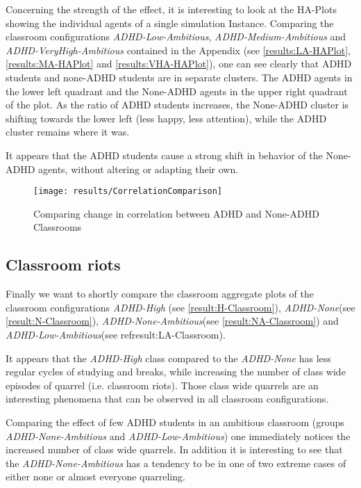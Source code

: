 Concerning the strength of the effect, it is interesting to look at the HA-Plots
showing the individual agents of a single simulation Instance. Comparing the classroom
configurations \textit{ADHD-Low-Ambitious}, \textit{ADHD-Medium-Ambitious} and
\textit{ADHD-VeryHigh-Ambitious} contained in the Appendix (see \ref{results:LA-HAPlot}, \ref{results:MA-HAPlot} and \ref{results:VHA-HAPlot}),
one can see clearly that ADHD students and none-ADHD students are in separate clusters.
The ADHD agents in the lower left quadrant and the None-ADHD agents in the upper right quadrant of the plot.
As the ratio of ADHD students increases, the None-ADHD cluster is shifting
towards the lower left (less happy, less attention), while the ADHD cluster remains
where it was.

\bb

It appears that the ADHD students cause a strong shift in behavior of the None-ADHD
agents, without altering or adapting their own.

\begin{figure}[]
    \centering
    \texttt{[image: results/CorrelationComparison]}
    \caption{Comparing change in correlation between ADHD and None-ADHD Classrooms}
    \label{CorrleationComparison}
\end{figure}

\subsection{Classroom riots}
Finally we want to shortly compare the classroom aggregate plots of the classroom
configurations \textit{ADHD-High} (see \ref{result:H-Classroom}), \textit{ADHD-None}(see \ref{result:N-Classroom}),
\textit{ADHD-None-Ambitious}(see \ref{result:NA-Classroom}) and \textit{ADHD-Low-Ambitious}(see ref{result:LA-Classroom}).

\bb

It appears that the \textit{ADHD-High} class compared to the \textit{ADHD-None}
has less regular cycles of studying and breaks, while increasing the number of
class wide episodes of quarrel (i.e. classroom riots). Those class wide quarrels
are an interesting phenomena that can be observed in all classroom configurations. 

\bb

Comparing the effect of few ADHD students in an ambitious classroom (groups
\textit{ADHD-None-Ambitious} and \textit{ADHD-Low-Ambitious}) one immediately
notices the increased number of class wide quarrels. In addition it is interesting
to see that the \textit{ADHD-None-Ambitious} has a tendency to be in one of
two extreme cases of either none or almost everyone quarreling. 
